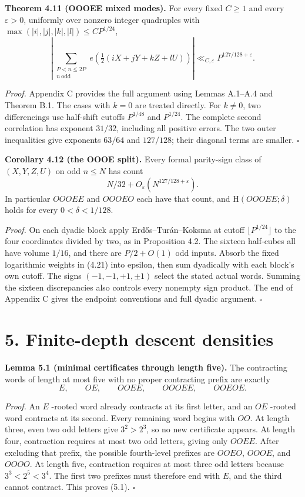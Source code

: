 \documentclass[11pt,a4paper]{article}
\begin{document}
\textbf{Theorem 4.11 (OOOEE mixed modes).} For every fixed \(C\ge1\) and
every \(\varepsilon>0\), uniformly over nonzero integer quadruples with
\(\max(|i|,|j|,|k|,|l|)\le CP^{1/24}\), \[
\left|\sum_{\substack{P<n\le2P\\n\ \mathrm{odd}}}
e\left(\tfrac12(iX+jY+kZ+lU)\right)\right|
\ll_{C,\varepsilon}P^{127/128+\varepsilon}.
\tag{4.21}
\]

\emph{Proof.} Appendix C provides the full argument using Lemmas
A.1--A.4 and Theorem B.1. The cases with \(k=0\) are treated directly.
For \(k\ne0\), two differencings use half-shift cutoffs \(P^{1/48}\) and
\(P^{1/24}\). The complete second correlation has exponent \(31/32\),
including all positive errors. The two outer inequalities give exponents
\(63/64\) and \(127/128\); their diagonal terms are smaller. \(\square\)


\textbf{Corollary 4.12 (the OOOE split).} Every formal parity-sign class
of \((X,Y,Z,U)\) on odd \(n\le N\) has count \[
N/32+O_\varepsilon(N^{127/128+\varepsilon}).
\tag{4.22}
\] In particular \(OOOEE\) and \(OOOEO\) each have that count, and
\(\mathrm H(OOOEE;\delta)\) holds for every \(0<\delta<1/128\).

\emph{Proof.} On each dyadic block apply Erd\H{o}s--Tur\'{a}n--Koksma at
cutoff \(\lfloor P^{1/24}\rfloor\) to the four coordinates divided by
two, as in Proposition 4.2. The sixteen half-cubes all have volume
\(1/16\), and there are \(P/2+O(1)\) odd inputs. Absorb the fixed
logarithmic weights in (4.21) into epsilon, then sum dyadically with
each block's own cutoff. The signs \((-1,-1,+1,\pm1)\) select the stated
actual words. Summing the sixteen discrepancies also controls every
nonempty sign product. The end of Appendix C gives the endpoint
conventions and full dyadic argument. \(\square\)


\section{5. Finite-depth descent
densities}\label{finite-depth-descent-densities}

\textbf{Lemma 5.1 (minimal certificates through length five).} The
contracting words of length at most five with no proper contracting
prefix are exactly \[
E,\qquad OE,\qquad OOEE,\qquad OOOEE,\qquad OOEOE.
\tag{5.1}
\]

\emph{Proof.} An \(E\) -rooted word already contracts at its first
letter, and an \(OE\) -rooted word contracts at its second. Every
remaining word begins with \(OO\). At length three, even two odd letters
give \(3^2>2^3\), so no new certificate appears. At length four,
contraction requires at most two odd letters, giving only \(OOEE\).
After excluding that prefix, the possible fourth-level prefixes are
\(OOEO\), \(OOOE\), and \(OOOO\). At length five, contraction requires
at most three odd letters because \(3^3<2^5<3^4\). The first two
prefixes must therefore end with \(E\), and the third cannot contract.
This proves (5.1). \(\square\)
\end{document}
